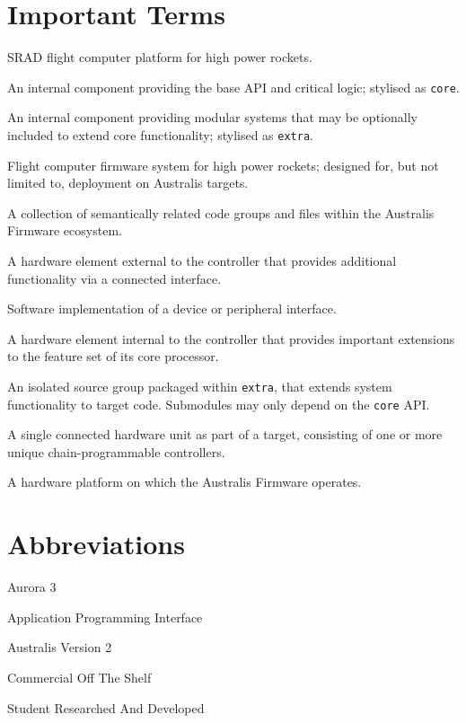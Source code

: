 \pagestyle{ruled}

\section*{Important Terms}
\begin{description}[leftmargin=8em,style=multiline]
    \item[Australis] SRAD flight computer platform for high power rockets.
    \item[Australis Core] An internal component providing the base API and critical logic; stylised as \verb|core|.
    \item[Australis Extra] An internal component providing modular systems that may be optionally included to extend core functionality; stylised as \verb|extra|.
    \item[Australis Firmware] Flight computer firmware system for high power rockets; designed for, but not limited to, deployment on Australis targets.
    \item[Component] A collection of semantically related code groups and files within the Australis Firmware ecosystem.
    \item[Device] A hardware element external to the controller that provides additional functionality via a connected interface.
    \item[Driver] Software implementation of a device or peripheral interface.
    \item[Peripheral] A hardware element internal to the controller that provides important extensions to the feature set of its core processor.
    \item[Submodule] An isolated source group packaged within \verb|extra|, that extends system functionality to target code. Submodules may only depend on the \verb|core| API.
    \item[Subtarget] A single connected hardware unit as part of a target, consisting of one or more unique chain-programmable controllers.
    \item[Target] A hardware platform on which the Australis Firmware operates.
\end{description}

\section*{Abbreviations}
\begin{description}[leftmargin=4em,style=multiline]
    \item[A3\footnotemark] Aurora 3
    \item[API] Application Programming Interface
    \item[AV2] Australis Version 2
    \item[COTS] Commercial Off The Shelf
    \item[SRAD] Student Researched And Developed
\end{description}

